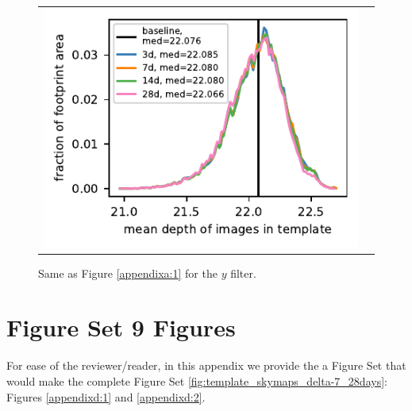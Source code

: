 \documentclass[preprintm,linenumbers]{aastex631}
\begin{document}
\begin{figure}[h]
\begin{tabular}{@{}c@{}c@{}}
					\includegraphics{results/histograms_templates_tscale/hist_first_year_one_snap_v4_0_10yrs_db_noDD_noTwi_doALLTemplateMetrics_reduceDepthTemplate_y_noDD_noTwi.pdf} \\
					
				\end{tabular}
			\caption{
				Same as Figure \ref{appendixa:1} for the $y$ filter.  
           \label{appendixa:6}
			}
		\end{figure}
		



        
		\section{Figure Set 9 Figures}
		
		For ease of the reviewer/reader, in this appendix we provide the a Figure Set that would make the complete Figure Set \ref{fig:template_skymaps_delta-7_28days}: Figures \ref{appendixd:1} and \ref{appendixd:2}.
\end{document}
